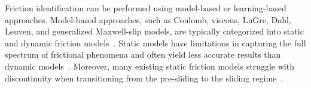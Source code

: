 Friction identification can be performed using model-based or learning-based approaches. Model-based approaches, such as Coulomb, viscous, LuGre, Dahl, Leuven, and generalized Maxwell-slip models, are typically categorized into static and dynamic friction models~\cite{awrejcewicz2005analysis}. Static models have limitations in capturing the full spectrum of frictional phenomena and often yield less accurate results than dynamic models~\cite{iurian2005identification}. Moreover, many existing static friction models struggle with discontinuity when transitioning from the pre-sliding to the sliding regime~\cite{olejnik2013application, jin2019joint}.
